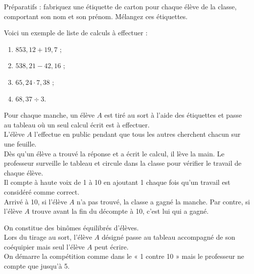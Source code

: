 
\begin{TP}
Préparatifs : fabriquez une étiquette de carton pour chaque élève de la classe, comportant son nom et son prénom. Mélangez ces étiquettes.

Voici un exemple de liste de calculs à effectuer :
\begin{enumerate}
 \item $853,12 + 19,7$ ;
 \item $538,21 - 42,16$ ;
 \item $65,24 \cdot 7,38$ ;
 \item $68,37 \div 3$.
 \end{enumerate}

Pour chaque manche, un élève $A$ est tiré au sort à l'aide des étiquettes et passe au tableau où un seul calcul écrit est à effectuer. \\[0.5em]
L'élève $A$ l'effectue en public pendant que tous les autres cherchent chacun sur une feuille. \\[0.5em]
Dès qu'un élève a trouvé la réponse et a écrit le calcul, il lève la main. Le professeur surveille le tableau et circule dans la classe pour vérifier le travail de chaque élève. \\[0.5em]
Il compte à haute voix de 1 à 10 en ajoutant 1 chaque fois qu'un travail est considéré comme correct. \\[0.5em]
Arrivé à 10, si l'élève $A$ n'a pas trouvé, la classe a gagné la manche. Par contre, si l'élève $A$ trouve avant la fin du décompte à 10, c'est lui qui a gagné.

On constitue des binômes équilibrés d'élèves.\\[0.5em]
Lors du tirage au sort, l'élève $A$ désigné passe au tableau accompagné de son coéquipier mais seul l'élève $A$ peut écrire. \\[0.5em]
On démarre la compétition comme dans le « 1 contre 10 » mais le professeur ne compte que jusqu'à 5. 
\end{TP}

\newpage
